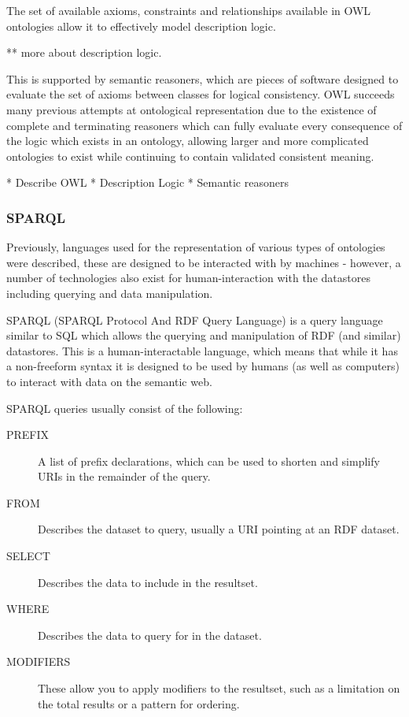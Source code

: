 \documentclass{article}
\begin{document}
The set of available axioms, constraints and relationships available in OWL
ontologies allow it to effectively model description logic\cite{desclogic}. 

** more about description logic.

This is supported by semantic reasoners, which are pieces of software designed
to evaluate the set of axioms between classes for logical consistency. OWL
succeeds many previous attempts at ontological representation due to the
existence of complete and terminating reasoners which can fully evaluate every
consequence of the logic which exists in an ontology, allowing larger and more
complicated ontologies to exist while continuing to contain validated 
consistent meaning.

* Describe OWL
* Description Logic
* Semantic reasoners

\subsubsection{SPARQL}

Previously, languages used for the representation of various types of ontologies
were described, these are designed to be interacted with by machines - however,
a number of technologies also exist for human-interaction with the datastores
including querying and data manipulation.

SPARQL (SPARQL Protocol And RDF Query Language) is a query language similar to
SQL which allows the querying and manipulation of RDF (and similar) datastores.
This is a human-interactable language, which means that while it has a
non-freeform syntax it is designed to be used by humans (as well as computers)
to interact with data on the semantic web.

SPARQL queries usually consist of the following:

\begin{description}
    \item[PREFIX] A list of prefix declarations, which can be used to shorten
    and simplify URIs in the remainder of the query.
    \item[FROM] Describes the dataset to query, usually a URI pointing at an RDF
    dataset.
    \item[SELECT] Describes the data to include in the resultset.
    \item[WHERE] Describes the data to query for in the dataset.
    \item[MODIFIERS] These allow you to apply modifiers to the resultset, such
    as a limitation on the total results or a pattern for ordering.
\end{description}
\end{document}
